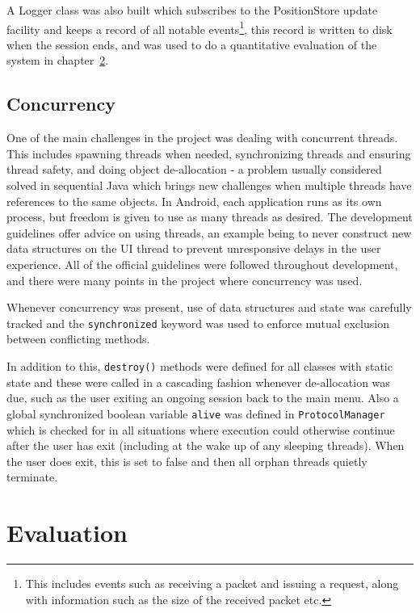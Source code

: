 \label{logging}
A Logger class was also built which subscribes to the PositionStore update facility and keeps a record of all notable events\footnote{This includes events such as receiving a packet and issuing a request, along with information such as the size of the received packet etc.}, this record is written to disk when the session ends, and was used to do a quantitative evaluation of the system in chapter~\ref{eval}.

\section{Concurrency}

One of the main challenges in the project was dealing with concurrent threads. This includes spawning threads when needed, synchronizing threads and ensuring thread safety, and doing object de-allocation - a problem usually considered solved in sequential Java which brings new challenges when multiple threads have references to the same objects.
In Android, each application runs as its own process, but freedom is given to use as many threads as desired. The development guidelines offer advice on using threads, an example being to never construct new data structures on the UI thread to prevent unresponsive delays in the user experience. All of the official guidelines were followed throughout development, and there were many points in the project where concurrency was used.\cite{androidAPI}

Whenever concurrency was present, use of data structures and state was carefully tracked and the {\tt synchronized} keyword was used to enforce mutual exclusion between conflicting methods.

In addition to this, {\tt destroy()} methods were defined for all classes with static state and these were called in a cascading fashion whenever de-allocation was due, such as the user exiting an ongoing session back to the main menu. Also a global synchronized boolean variable {\tt alive} was defined in {\tt ProtocolManager} which is checked for in all situations where execution could otherwise continue after the user has exit (including at the wake up of any sleeping threads). When the user does exit, this is set to false and then all orphan threads quietly terminate.

\cleardoublepage
\chapter{Evaluation}
\label{eval}

